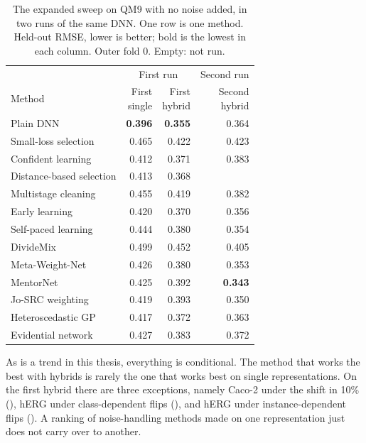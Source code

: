 \begin{table}[htbp]
\centering
\begin{tabular}{@{}lrrr@{}}
\toprule
 & \multicolumn{2}{c}{First run} & \multicolumn{1}{c}{Second run} \\
\cmidrule(lr){2-3}\cmidrule(l){4-4}
Method & \makecell[r]{First\\single} & \makecell[r]{First\\hybrid} & \makecell[r]{Second\\hybrid} \\
\midrule
Plain DNN & \textbf{0.396} & \textbf{0.355} & 0.364 \\
\midrule
Small-loss selection & 0.465 & 0.422 & 0.423 \\
Confident learning & 0.412 & 0.371 & 0.383 \\
Distance-based selection & 0.413 & 0.368 &  \\
Multistage cleaning & 0.455 & 0.419 & 0.382 \\
Early learning & 0.420 & 0.370 & 0.356 \\
Self-paced learning & 0.444 & 0.380 & 0.354 \\
DivideMix & 0.499 & 0.452 & 0.405 \\
Meta-Weight-Net & 0.426 & 0.380 & 0.353 \\
MentorNet & 0.425 & 0.392 & \textbf{0.343} \\
Jo-SRC weighting & 0.419 & 0.393 & 0.350 \\
Heteroscedastic GP & 0.417 & 0.372 & 0.363 \\
Evidential network & 0.427 & 0.383 & 0.372 \\
\bottomrule
\end{tabular}
\caption[The expanded sweep on QM9 with no noise added.]{The expanded sweep on QM9 with no noise added, in two runs of the same DNN. One row is one method. Held-out RMSE, lower is better; bold is the lowest in each column. Outer fold 0. Empty: not run.}
\label{tab:noise:res:qm9_sweep}
\end{table}

As is a trend in this thesis, everything is conditional. The method that works the best with hybrids is rarely the one that works best on single representations. On the first hybrid there are three exceptions, namely Caco-2 under the shift in 10\% (), hERG under class-dependent flips (), and hERG under instance-dependent flips (). A ranking of noise-handling methods made on one representation just does not carry over to another.

